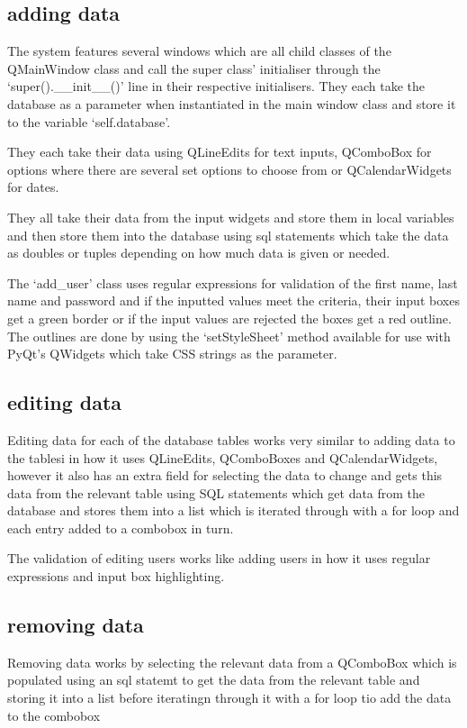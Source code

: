 \subsection{adding data}
The system features several windows which are all child classes of the QMainWindow class and call the super class' initialiser through the `super().\_\_init\_\_()' line in their respective initialisers. They each take the database as a parameter when instantiated in the main window class and store it to the variable `self.database'.

They each take their data using QLineEdits for text inputs, QComboBox for options where there are several set options to choose from or QCalendarWidgets for dates.

They all take their data from the input widgets and store them in local variables and then store them into the database using sql statements  which take the data as doubles or tuples depending on how much data is given or needed.

The `add\_user' class uses regular expressions for validation of the first name, last name and password and if the inputted values meet the criteria, their input boxes get a green border or if the input values are rejected the boxes get a red outline. The outlines are done by using the `setStyleSheet' method available for use with PyQt's QWidgets which take CSS strings as the parameter.

\subsection{editing data}
Editing data for each of the database tables works very similar to adding data to the tablesi in how it uses QLineEdits, QComboBoxes and QCalendarWidgets, however it also has an extra field for selecting the data to change and gets this data from the relevant table using SQL  statements which get data from the database and stores them into a list which is iterated through with a for loop and each entry added to a combobox in turn.

The validation of editing users works like adding users in how it uses regular expressions and input box highlighting.

\subsection{removing data}
Removing data works by selecting the relevant data from a QComboBox which is populated using an sql statemt to get the data from the relevant table and storing it into a list before iteratingn through it with a for loop tio add the data to the combobox

